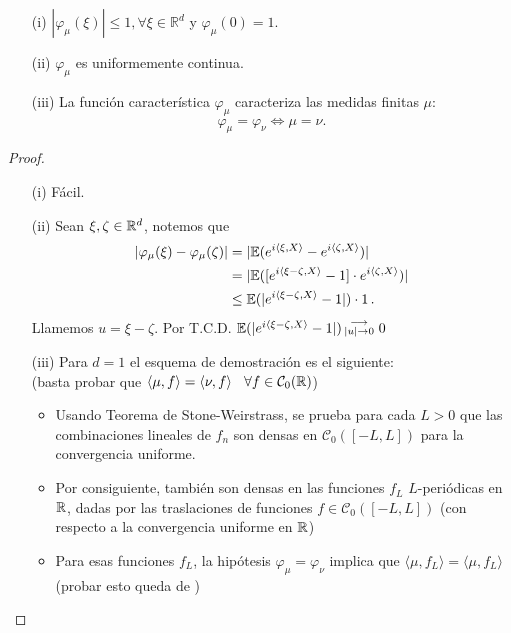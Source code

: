 \begin{property}
\beforeitemize
\begin{itemize}
    \item[(i)] $|\varphi_\mu(\xi)|\leq 1,  \forall \xi \in\mathbb{R}^d$ y $\varphi_\mu(0)=1$.
    \item[(ii)] $\varphi_\mu$ es uniformemente continua.
    \item[(iii)] La función característica $\varphi_\mu$ caracteriza las medidas finitas $\mu$:
    $$ \varphi_\mu=\varphi_\nu\iff\mu=\nu.$$
\end{itemize}
\end{property}
\begin{proof}
\gris
\beforeitemize
\begin{itemize}
    \item[(i)] Fácil.
    \item[(ii)] Sean $\xi,\zeta\in\mathbb{R}^d$, notemos que
    \begin{alignat*}{2}
        |\varphi_\mu(\xi)-\varphi_\mu(\zeta)| & = |\mathbb{E}(e^{i\langle\xi,X\rangle}-e^{i\langle\zeta,X\rangle})| \\
         & = |\mathbb{E}([e^{i\langle\xi-\zeta,X\rangle}-1]\cdot e^{i\langle\zeta,X\rangle})| \\
         & \leq \mathbb{E}(|e^{i\langle\xi-\zeta,X\rangle}-1|)\cdot 1 \, .
    \end{alignat*}
    Llamemos $u=\xi-\zeta$. Por T.C.D. $\mathbb{E}(|e^{i\langle\xi-\zeta,X\rangle}-1|)\,\substack{\longrightarrow \\ |u|\to 0}\mbox{ }0$
    \item[(iii)]
    Para $d=1$ el esquema de demostración es el siguiente: %
    \\ (basta probar que $\langle \mu,f\rangle = \langle\nu,f\rangle \hspace{.25cm}\, \forall f\in\mathcal{C}_0(\mathbb{R})$)
    \begin{itemize}
        \item Usando Teorema de Stone-Weirstrass, se prueba para cada $L>0$ que las combinaciones lineales de $f_n$ son densas en $\mathcal{C}_0([-L,L])$ para la convergencia uniforme.
        \item Por consiguiente, también son densas en las funciones $f_L$ $L$-periódicas en $\mathbb{R}$, dadas por las traslaciones de funciones $f\in\mathcal{C}_0([-L,L])$ (con respecto a la convergencia uniforme en $\mathbb{R}$)
        \item Para esas funciones $f_L$, la hipótesis $\varphi_\mu=\varphi_\nu$ implica que $\langle\mu,f_L\rangle=\langle\mu,f_L\rangle$ (probar esto queda de \ejercicio\gris)

\end{itemize}
\end{itemize}
\end{proof}
